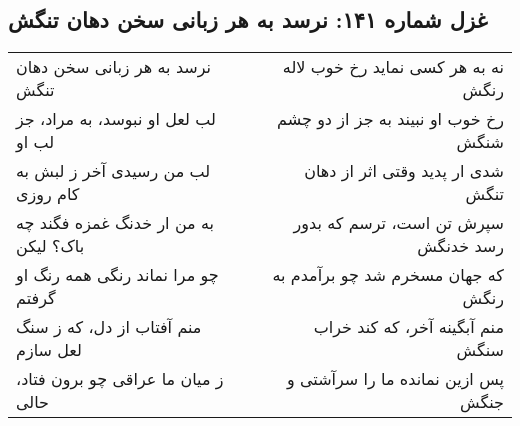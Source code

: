 \begin{center}
\section*{غزل شماره ۱۴۱: نرسد به هر زبانی سخن دهان تنگش}
\label{sec:141}
\begin{longtable}{l p{0.5cm} r}
نرسد به هر زبانی سخن دهان تنگش
&&
نه به هر کسی نماید رخ خوب لاله رنگش
\\
لب لعل او نبوسد، به مراد، جز لب او
&&
رخ خوب او نبیند به جز از دو چشم شنگش
\\
لب من رسیدی آخر ز لبش به کام روزی
&&
شدی ار پدید وقتی اثر از دهان تنگش
\\
به من ار خدنگ غمزه فگند چه باک؟ لیکن
&&
سپرش تن است، ترسم که بدور رسد خدنگش
\\
چو مرا نماند رنگی همه رنگ او گرفتم
&&
که جهان مسخرم شد چو برآمدم به رنگش
\\
منم آفتاب از دل، که ز سنگ لعل سازم
&&
منم آبگینه آخر، که کند خراب سنگش
\\
ز میان ما عراقی چو برون فتاد، حالی
&&
پس ازین نمانده ما را سرآشتی و جنگش
\\
\end{longtable}
\end{center}
